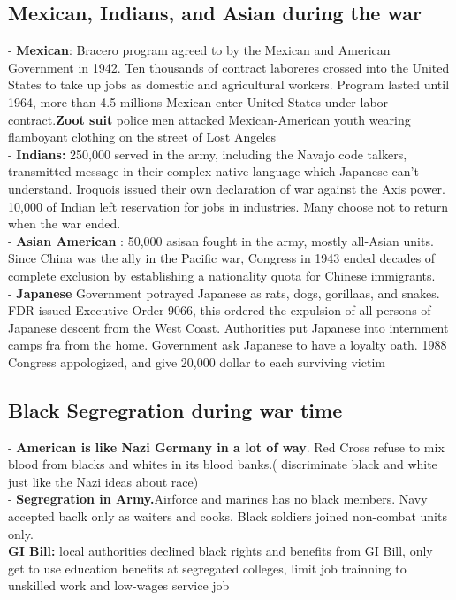 \documentclass{article}
\begin{document}
\subsection { Mexican, Indians, and Asian during the war}
- \textbf{Mexican}: Bracero program agreed to by the Mexican and American Government in 1942. Ten thousands of contract laboreres crossed into the United States to take up jobs as domestic and agricultural workers. Program lasted until 1964, more than 4.5 millions Mexican enter United States under labor contract.\textbf{Zoot suit} police men attacked Mexican-American youth wearing flamboyant clothing on the street of Lost Angeles\\
- \textbf{ Indians: } 250,000 served in the army, including the Navajo code talkers, transmitted message in their complex native language which Japanese can't understand. Iroquois issued their own declaration  of war against the Axis power. 10,000 of Indian left reservation for jobs in industries. Many choose not to return when the war ended.\\
- \textbf{ Asian American }: 50,000 asisan fought in the army, mostly all-Asian units. Since China was the ally in the Pacific war, Congress in 1943 ended decades of complete exclusion by establishing a nationality quota for Chinese immigrants.\\
- \textbf{Japanese } Government potrayed Japanese as rats, dogs, gorillaas, and snakes. FDR issued Executive Order 9066, this ordered the expulsion of all persons of Japanese descent from the West Coast. Authorities put Japanese into internment camps fra from the home. Government ask Japanese to have a loyalty oath. 1988 Congress appologized, and give 20,000 dollar to each surviving victim\\

\subsection{ Black Segregration during war time}
- \textbf{ American is like Nazi Germany in a lot of way}. Red Cross refuse to mix blood from blacks and whites in its blood banks.( discriminate black and white just like the Nazi ideas about race)\\
-\textbf{ Segregration in Army.}Airforce and marines has no black members. Navy accepted baclk only as waiters and cooks. Black soldiers joined non-combat units only.\\
\textbf{GI Bill:} local authorities declined black rights and benefits from GI Bill, only get to use education benefits at segregated colleges, limit job trainning to unskilled work and low-wages service job\\
\end{document}
